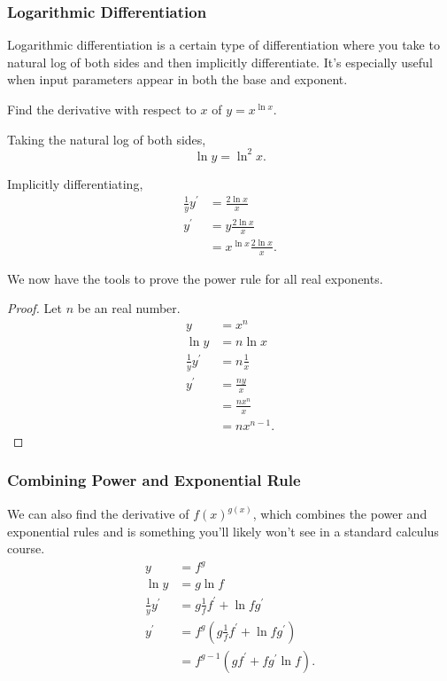 \subsubsection{Logarithmic Differentiation}
Logarithmic differentiation is a certain type of differentiation where you take to natural log of both sides and then implicitly differentiate.
It's especially useful when input parameters appear in both the base and exponent.
\begin{example}
	Find the derivative with respect to $x$ of $y = x^{\ln{x}}$.
\end{example}
\begin{answer}
	Taking the natural log of both sides,
	\begin{equation*}
		\ln{y} = \ln^2{x}.
	\end{equation*}
	
	Implicitly differentiating,
	\begin{align*}
		\frac{1}{y}y^\prime &= \frac{2\ln{x}}{x} \\
		y^\prime &= y\frac{2\ln{x}}{x} \\
		&= x^{\ln{x}}\frac{2\ln{x}}{x}.
	\end{align*}
\end{answer}


We now have the tools to prove the power rule for all real exponents.
\begin{proof}
	Let $n$ be an real number.
	\begin{align*}
		y &= x^n \\
		\ln{y} &= n\ln{x} \\
		\frac{1}{y}y^\prime &= n\frac{1}{x} \\
		y^\prime &= \frac{ny}{x} \\
		&= \frac{nx^n}{x} \\
		&= nx^{n-1}.
	\end{align*}
\end{proof}

\subsubsection{Combining Power and Exponential Rule}
We can also find the derivative of $f(x)^{g(x)}$, which combines the power and exponential rules and is something you'll likely won't see in a standard calculus course.
\begin{align*}
	y &= f^g \\
	\ln{y} &= g\ln{f} \\
	\frac{1}{y}y^\prime &= g\frac{1}{f}f^\prime + \ln{f}g^\prime \\
	y^\prime &= f^g\left(g\frac{1}{f}f^\prime + \ln{f}g^\prime\right) \\
	&= f^{g-1}\left(gf^\prime + fg^\prime\ln{f}\right).
\end{align*}
